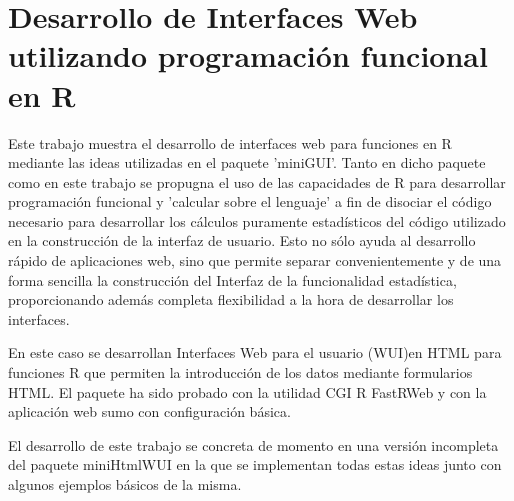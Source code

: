 \chapter{Desarrollo de Interfaces Web utilizando programación funcional en R}




  Este trabajo muestra el desarrollo de interfaces web para funciones en R mediante las ideas utilizadas en el paquete 'miniGUI'. Tanto en dicho paquete como en este trabajo se propugna el uso de las capacidades de R para desarrollar programación funcional y 'calcular sobre el lenguaje' a fin de disociar el código necesario para desarrollar los  cálculos puramente estadísticos del código utilizado en la construcción de la interfaz 
de usuario. Esto no sólo ayuda al desarrollo rápido de aplicaciones web, sino que permite separar convenientemente y de una forma sencilla la construcción del Interfaz de la funcionalidad estadística, proporcionando además completa flexibilidad a la hora de desarrollar los interfaces.

  En este caso se desarrollan Interfaces Web para el usuario (WUI)en HTML para 
funciones R que permiten la introducción de los datos mediante formularios HTML. 
El paquete ha sido probado con la utilidad CGI R FastRWeb y con la aplicación 
web sumo con configuración básica.

  El desarrollo de este trabajo se concreta de momento en una versión incompleta
del paquete miniHtmlWUI en la que se implementan todas estas ideas junto 
con algunos ejemplos básicos de la misma.  

%

%
